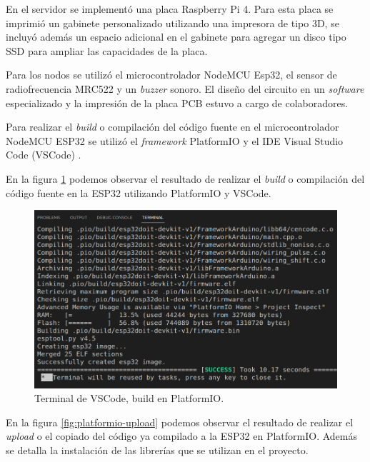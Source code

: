 En el servidor se implementó una placa Raspberry Pi 4. Para esta placa se imprimió un gabinete personalizado utilizando una impresora de tipo 3D, se incluyó además un espacio adicional en el gabinete para agregar un disco tipo SSD para ampliar las capacidades de la placa.


Para los nodos se utilizó el microcontrolador NodeMCU Esp32, el sensor de radiofrecuencia MRC522 y un \textit{buzzer} sonoro. El diseño del circuito en un \textit{software} especializado y la impresión de la placa PCB estuvo a cargo de colaboradores.  

Para realizar el \textit{build} o compilación del código fuente en el microcontrolador NodeMCU ESP32 se utilizó el \textit{framework} PlatformIO \cite{platformio} y el IDE Visual Studio Code (VSCode) \cite{vscode}.

En la figura \ref{fig:platformio-build} podemos observar el resultado de realizar el \textit{build}  o compilación del código fuente en la ESP32 utilizando PlatformIO y VSCode.

\begin{figure}[H]
	\centering
	\includegraphics[width=\textwidth]{./Figures/platformio-build.png}
	\caption{Terminal de VSCode, build en PlatformIO.}
	\label{fig:platformio-build}
\end{figure}

En la figura \ref{fig:platformio-upload} podemos observar el resultado de realizar el \textit{upload} o el copiado del código ya compilado a la ESP32 en PlatformIO. Además se detalla la instalación de las librerías que se utilizan en el proyecto.

